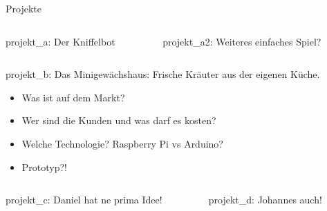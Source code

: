 \documentclass{beamer}
\begin{document}
\begin{frame}{Projekte}

\begin{columns}[]

  \begin{column}{0.45\textwidth}
    
    \begin{alertblock}{projekt\_a:}
    Der Kniffelbot \phantom{p}
    \end{alertblock}
	
  \end{column}
  \begin{column}{0.45\textwidth}
    
    \begin{exampleblock}{projekt\_a2:}
    Weiteres einfaches Spiel?
    \end{exampleblock}
	
  \end{column}
\end{columns}

\begin{alertblock}{projekt\_b:}
Das Minigew\"achshaus: Frische Kr\"auter aus der eigenen K\"uche.\\
\begin{itemize}
 \item Was ist auf dem Markt?
 \item Wer sind die Kunden und was darf es kosten?
 \item Welche Technologie? Raspberry Pi vs Arduino?
 \item Prototyp?!
\end{itemize}
\end{alertblock}

\begin{columns}[]

  \begin{column}{0.45\textwidth}
    
    \begin{exampleblock}{projekt\_c:}
    Daniel hat ne prima Idee!
    \end{exampleblock}
	
  \end{column}
  \begin{column}{0.45\textwidth}
    
    \begin{exampleblock}{projekt\_d:}
    Johannes auch! \phantom{p}
    \end{exampleblock}
	
  \end{column}
\end{columns}

\end{frame}
\end{document}
